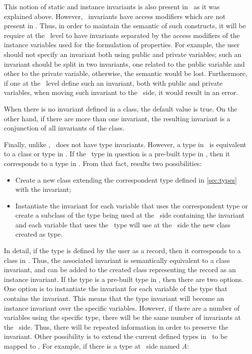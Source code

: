 This notion of static and instance invariants is also present in \vpp\ as it was explained above. However, \jml\ invariants have access modifiers which are not present in \vpp. Thus, in order to maintain the semantic of such constructs, it will be require at the \vpp\ level to have invariants separated by the access modifiers of the instance variables used for the formulation of properties. For example, the user should not specify an invariant both using public and private variables; such an invariant should be split in two invariants, one related to the public variable and other to the private variable, otherwise, the semantic would be lost. Furthermore, if one at the \vpp\ level define such an invariant, both with public and private variables, when moving such invariant to the \jml\ side, it would result in an error.

When there is no invariant defined in a class, the default value is true. On the other hand, if there are more than one invariant, the resulting invariant is a conjunction of all invariants of the class. 

Finally, unlike \vpp, \jml\ does not have type invariants. However, a type in \vpp\ is equivalent to a class or type in \jml. If the \vpp\ type in question is a pre-built type in \vpp, then it corresponds to a type in \jml. From that fact, results two possibilities: 
\begin{itemize}
\item Create a new class extending the correspondent type defined in \ref{sec:types} with the invariant;
\item Instantiate the invariant for each variable that uses the correspondent type or create a subclass of the type being used at the \jml\ side containing the invariant and each variable that uses the \vpp\ type will use at the \jml\ side the new class created as type. 
\end{itemize}

In detail, if the type is defined by the user as a record, then it corresponds to a class in \jml. Thus, the associated invariant is semantically equivalent to a class invariant, and can be added to the created class representing the record as an instance invariant. If the type is a pre-built type in \vpp, then there are two options. One option is to instantiate the invariant for each variable of the type that contains the invariant. This means that the type invariant will become an instance invariant over the specific variables. However, if there are a number of variables using the specific type, there will be the same number of invariants at the \jml\ side. Thus, there will be repeated information in order to preserve the invariant. Other possibility is to extend the current defined types in \jml\ to be mapped to \vpp. For example, if there is a type at \vpp\ side named \textit{A}:

